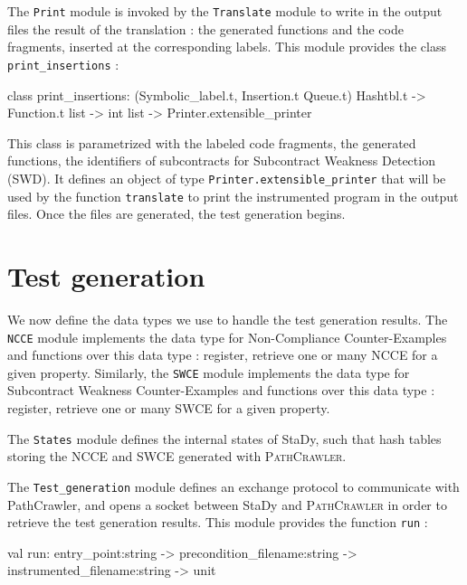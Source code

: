 \documentclass[web]{frama-c-book}
\begin{document}
The \lstinline[language=OCaml]'Print' module is invoked by the \lstinline[language=OCaml]'Translate' module to write in the output files the result of the translation : the generated functions and the code fragments, inserted at the corresponding labels. This module provides the class \lstinline[language=OCaml]'print_insertions' :

\begin{ocamlcode}
  class print_insertions:
    (Symbolic_label.t, Insertion.t Queue.t) Hashtbl.t -> Function.t list -> int list
    -> Printer.extensible_printer
\end{ocamlcode}

This class is parametrized with the labeled code fragments, the generated functions, the identifiers of subcontracts for Subcontract Weakness Detection (SWD). It defines an object of type \lstinline[language=OCaml]'Printer.extensible_printer' that will be used by the function \lstinline[language=OCaml]'translate' to print the instrumented program in the output files. Once the files are generated, the test generation begins.

\section{Test generation}

We now define the data types we use to handle the test generation results.
The \lstinline[language=OCaml]'NCCE' module implements the data type for Non-Compliance Counter-Examples and functions over this data type : register, retrieve one or many NCCE for a given property. Similarly, the \lstinline[language=OCaml]'SWCE' module implements the data type for Subcontract Weakness Counter-Examples and functions over this data type : register, retrieve one or many SWCE for a given property.

The \lstinline[language=OCaml]'States' module defines the internal states of StaDy, such that hash tables storing the NCCE and SWCE generated with \textsc{PathCrawler}.

The \lstinline[language=OCaml]'Test_generation' module defines an exchange protocol to communicate with PathCrawler, and opens a socket between StaDy and \textsc{PathCrawler} in order to retrieve the test generation results. This module provides the function \lstinline[language=OCaml]'run' :

\begin{ocamlcode}
  val run:
    entry_point:string -> precondition_filename:string -> instrumented_filename:string
    -> unit
\end{ocamlcode}
\end{document}
